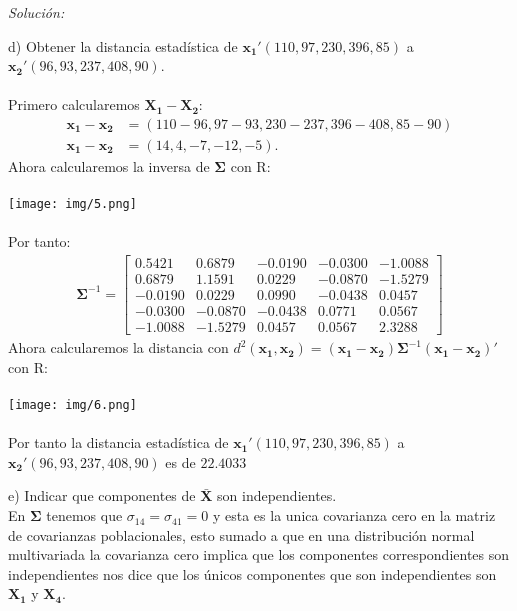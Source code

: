 \documentclass[12pt]{article}
\newenvironment{sol}
    {\emph{Solución:}
    }
    {
    }
\begin{document}
\begin{sol}
\pagebreak
d) Obtener la distancia estadística de $\mathbf{x_1}'(110, 97, 230, 396, 85)$ a $\mathbf{x_2}'(96, 93, 237, 408, 90)$. \\\\
Primero calcularemos  \(\mathbf{X_1} - \mathbf{X_2}\):
\begin{align*}
\mathbf{x_1} - \mathbf{x_2} &= (110 - 96, 97 - 93, 230 - 237, 396 - 408, 85 - 90) \\
\mathbf{x_1} - \mathbf{x_2}&= (14, 4, -7, -12, -5).
\end{align*}
Ahora calcularemos la inversa de $\mathbf{\Sigma}$ con R: \\\\
\texttt{[image: img/5.png]}\\\\
Por tanto:
\begin{align*}
\mathbf{\Sigma}^{-1} = \begin{bmatrix}
  0.5421 &  0.6879 & -0.0190 & -0.0300 & -1.0088 \\
  0.6879 &  1.1591 &  0.0229 & -0.0870 & -1.5279 \\
 -0.0190 &  0.0229 &  0.0990 & -0.0438 &  0.0457 \\
 -0.0300 & -0.0870 & -0.0438 &  0.0771 &  0.0567 \\
 -1.0088 & -1.5279 &  0.0457 &  0.0567 &  2.3288
\end{bmatrix}
\end{align*}
Ahora calcularemos la distancia con $d^2(\mathbf{x_1,x_2})=(\mathbf{x_1-x_2})\mathbf{\Sigma}^{-1}(\mathbf{x_1-x_2})'$ con R:\\\\
\texttt{[image: img/6.png]}\\\\
Por tanto la distancia estadística de $\mathbf{x_1}'(110, 97, 230, 396, 85)$ a $\mathbf{x_2}'(96, 93, 237, 408, 90)$ es de $22.4033$ 

\pagebreak

e) Indicar que componentes de $\mathbf{\bar{X}}$ son independientes.\\ 
En $\mathbf{\Sigma}$ tenemos que $\sigma_{14} = \sigma_{41} = 0$ y esta es la unica covarianza cero en la matriz de covarianzas poblacionales, esto sumado a que en una distribución normal multivariada la covarianza cero implica que los componentes correspondientes son independientes nos dice que los únicos componentes que son independientes son $\mathbf{X_1}$ y $\mathbf{X_4}$.
\end{sol}
\end{document}
